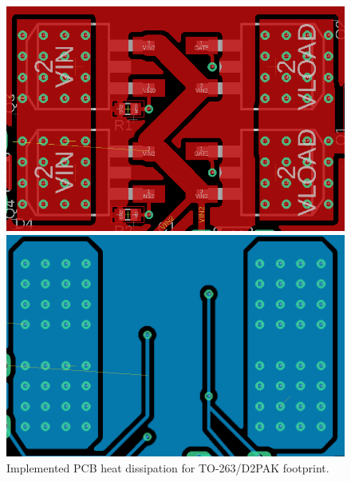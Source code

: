 \documentclass[../main.tex]{subfiles}
\begin{document}
    \begin{figure}[!h]
        \centering
        \begin{minipage}{.4\textwidth}
          \centering
          \includegraphics[width=\linewidth]{media/d2pak_thermal_vias_top.png}
        \end{minipage}\qquad
        \begin{minipage}{.4\textwidth}
          \centering
          \includegraphics[width=\linewidth]{media/d2pak_thermal_vias_bottom.png}
        \end{minipage}
        \caption{Implemented PCB heat dissipation for TO-263/D2PAK footprint.}
    \end{figure}

    \pagebreak
\end{document}
